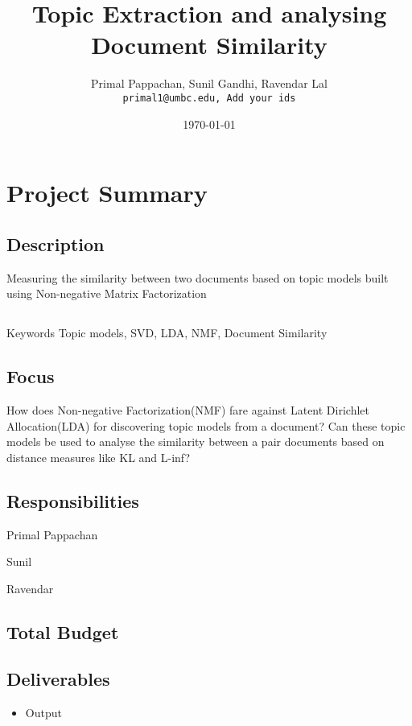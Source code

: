 \documentclass[a4paper,11pt]{article}
\begin{document}

\title{Topic Extraction and analysing Document Similarity}
\author{Primal Pappachan, Sunil Gandhi, Ravendar Lal \\ 
\texttt{primal1@umbc.edu, Add your ids}}
\date{\today}
\maketitle


\section{Project Summary}
\subsection{Description}
Measuring the similarity between two documents based on topic models built using Non-negative Matrix Factorization 
\subsection{}Keywords
Topic models, SVD, LDA, NMF, Document Similarity 
\subsection{Focus}
How does Non-negative Factorization(NMF) fare against Latent Dirichlet Allocation(LDA) for discovering topic models from a document? Can these topic models be used to analyse the similarity between a pair documents based on distance measures like KL and L-inf?
\subsection{Responsibilities}
\item Primal Pappachan
\item Sunil
\item Ravendar
\subsection{Total Budget} 

\subsection{Deliverables}

\begin{itemize}
\item Output
\end{itemize}
\end{document}
